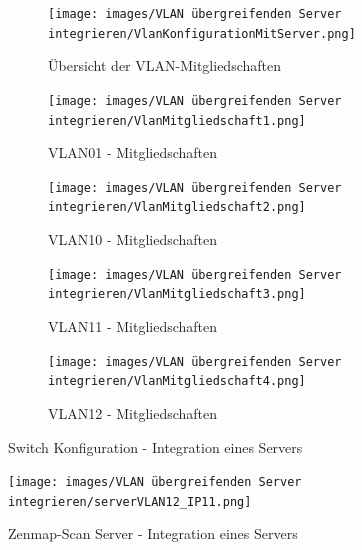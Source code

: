         \begin{figure}[H]
        \centering
            \begin{subfigure}{\linewidth}
                \centering
                \texttt{[image: images/VLAN übergreifenden Server integrieren/VlanKonfigurationMitServer.png]}
                \caption{Übersicht der VLAN-Mitgliedschaften}
            \end{subfigure}
            \begin{subfigure}{.49\linewidth}
                \centering
                \texttt{[image: images/VLAN übergreifenden Server integrieren/VlanMitgliedschaft1.png]}
                \caption{VLAN01 - Mitgliedschaften}
            \end{subfigure}
            \begin{subfigure}{.49\linewidth}
                \centering
                \texttt{[image: images/VLAN übergreifenden Server integrieren/VlanMitgliedschaft2.png]}
                \caption{VLAN10 - Mitgliedschaften}
            \end{subfigure}
            \begin{subfigure}{.49\linewidth}
                \centering
                \texttt{[image: images/VLAN übergreifenden Server integrieren/VlanMitgliedschaft3.png]}
                \caption{VLAN11 - Mitgliedschaften}
            \end{subfigure}
            \begin{subfigure}{.49\linewidth}
                \centering
                \texttt{[image: images/VLAN übergreifenden Server integrieren/VlanMitgliedschaft4.png]}
                \caption{VLAN12 - Mitgliedschaften}
            \end{subfigure}
        \caption{Switch Konfiguration - Integration eines Servers}
        \end{figure}
        \begin{figure}[H]
            \centering
            \texttt{[image: images/VLAN übergreifenden Server integrieren/serverVLAN12\_IP11.png]}
            \caption{Zenmap-Scan Server - Integration eines Servers}
        \end{figure}

        \newpage
